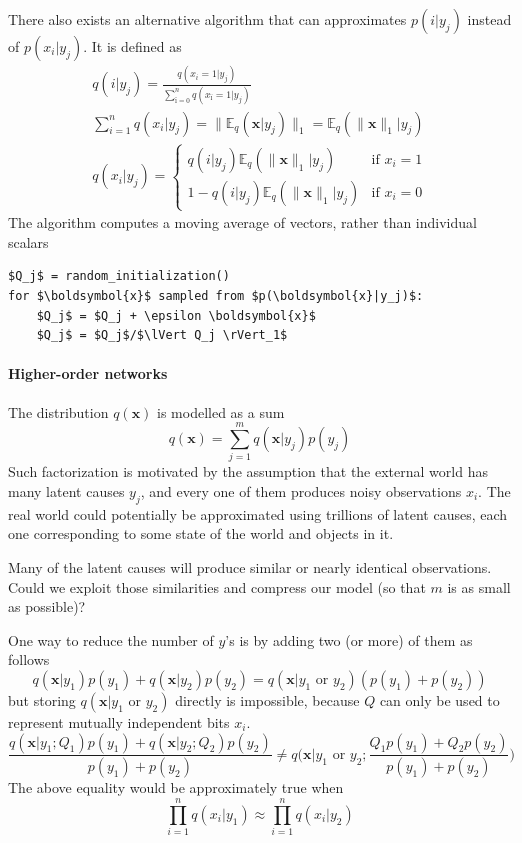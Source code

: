 \documentclass[12pt]{article}
\begin{document}
There also exists an alternative algorithm that can approximates $p(i|y_j)$ instead of $p(x_i|y_j)$. It is defined as
\begin{gather*}
	q(i|y_j) = \frac{q(x_i=1|y_j)}{\sum_{ï=0}^n{q(x_{ï}=1|y_j)}} \\
	\sum_{i=1}^n q(x_{i}|y_j) =  \lVert \mathbb{E}_q( \boldsymbol{x}|y_j) \rVert_1 = \mathbb{E}_q(\lVert \boldsymbol{x} \rVert_1|y_j) \\
	q(x_i|y_j) = \begin{cases}
		q(i|y_j)\mathbb{E}_q(\lVert \boldsymbol{x} \rVert_1|y_j)&\text{if }x_i=1 \\
		1-q(i|y_j)\mathbb{E}_q(\lVert \boldsymbol{x} \rVert_1|y_j)&\text{if }x_i=0 
	\end{cases}
\end{gather*}
The algorithm computes a moving average of vectors, rather than individual scalars
\begin{lstlisting}
$Q_j$ = random_initialization()
for $\boldsymbol{x}$ sampled from $p(\boldsymbol{x}|y_j)$:
    $Q_j$ = $Q_j + \epsilon \boldsymbol{x}$ 
    $Q_j$ = $Q_j$/$\lVert Q_j \rVert_1$
\end{lstlisting}

\paragraph{Higher-order networks}

The distribution $q(\boldsymbol{x})$ is modelled as a sum
\[
q(\boldsymbol{x}) = \sum_{j=1}^{m}q(\boldsymbol{x}|y_j)p(y_j) 
\]
Such factorization is motivated by the assumption that the external world has many latent causes $y_j$, and every one of them produces noisy observations $x_i$. The real world could potentially be approximated using trillions of latent causes, each one corresponding to some state of the world and objects in it. 

Many of the latent causes will produce similar or nearly identical observations. Could we exploit those similarities and compress our model (so that $m$ is as small as possible)? 

One way to reduce the number of $y$'s is by adding two (or more) of them as follows
\[
q(\boldsymbol{x}|y_1) p(y_1)+q(\boldsymbol{x}|y_2) p(y_2) = 
q(\boldsymbol{x}|y_1\text{ or }y_2) (p(y_1)+p(y_2))
\]
but storing $q(\boldsymbol{x}|y_1\text{ or }y_2)$ directly is impossible, because $Q$ can only be used to represent mutually independent bits $x_i$. 
\[
\frac{q(\boldsymbol{x}|y_1;Q_1) p(y_1)+q(\boldsymbol{x}|y_2;Q_2) p(y_2)}{p(y_1)+p(y_2)} \ne 
q\big(\boldsymbol{x}|y_1\text{ or }y_2;\frac{Q_1p(y_1) +Q_2p(y_2)}{p(y_1)+p(y_2)}\big) 
\]
The above equality would be approximately true when 
\[
\prod_{i=1}^{n}q(x_i|y_1)\approx \prod_{i=1}^{n}q(x_i|y_2)
\]
\end{document}
